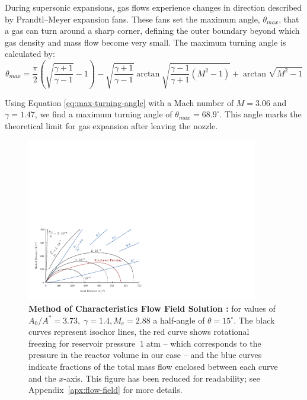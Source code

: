 		During supersonic expansions, gas flows experience changes in direction described by Prandtl–Meyer expansion fans.
		These fans set the maximum angle, $\theta_{max}$, that a gas can turn around a sharp corner, defining the outer boundary beyond which gas density and mass flow become very small.
		The maximum turning angle is calculated by:
		\begin{equation}
			\theta_{max} = \frac{\pi}{2} \left(\sqrt{\frac{\gamma + 1}{\gamma - 1}} - 1\right) - \sqrt{\frac{\gamma + 1}{\gamma - 1}}\arctan{\sqrt{\frac{\gamma - 1}{\gamma + 1}(M^2 - 1)}} + \arctan{\sqrt{M^2 -1}}
			\label{eq:max-turning-angle}
		\end{equation}

		Using Equation \eqref{eq:max-turning-angle} with a Mach number of $M = 3.06$ and $\gamma = 1.47$, we find a maximum turning angle of $\theta_{max} = 68.9^\circ$.
		This angle marks the theoretical limit for gas expansion after leaving the nozzle.

		\begin{figure}[H]
			\centering
		    \includegraphics[width=0.9\textwidth]{src/03_analytical-work/fig_velocity-distribution-reduced.pdf}
			\caption[Method of Characteristics Flow Field Solution \cite{Cassanova1965}]{
				\textbf{Method of Characteristics Flow Field Solution \cite{Cassanova1965}:}
				for values of $A_0/A^* = 3.73,\;\gamma=1.4,M_e =2.88$ a half-angle of $\theta = 15^\circ$.
				The black curves represent isochor lines, the red curve shows rotational freezing for reservoir pressure $~1\;\text{atm}$ -- which corresponds to the pressure in the reactor volume in our case -- and the blue curves indicate fractions of the total mass flow enclosed between each curve and the $x$-axis. 
				This figure has been reduced for readability; see Appendix~\ref{apx:flow-field} for more details.
			}
		\end{figure}

